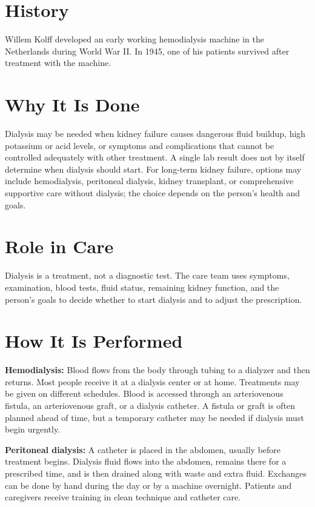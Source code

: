 \section*{History}
Willem Kolff developed an early working hemodialysis machine in the Netherlands during World War II. In 1945, one of his patients survived after treatment with the machine.

\section*{Why It Is Done}
Dialysis may be needed when kidney failure causes dangerous fluid buildup, high potassium or acid levels, or symptoms and complications that cannot be controlled adequately with other treatment. A single lab result does not by itself determine when dialysis should start. For long-term kidney failure, options may include hemodialysis, peritoneal dialysis, kidney transplant, or comprehensive supportive care without dialysis; the choice depends on the person's health and goals.

\section*{Role in Care}
Dialysis is a treatment, not a diagnostic test. The care team uses symptoms, examination, blood tests, fluid status, remaining kidney function, and the person's goals to decide whether to start dialysis and to adjust the prescription.

\section*{How It Is Performed}
\textbf{Hemodialysis:} Blood flows from the body through tubing to a dialyzer and then returns. Most people receive it at a dialysis center or at home. Treatments may be given on different schedules. Blood is accessed through an arteriovenous fistula, an arteriovenous graft, or a dialysis catheter. A fistula or graft is often planned ahead of time, but a temporary catheter may be needed if dialysis must begin urgently.

\textbf{Peritoneal dialysis:} A catheter is placed in the abdomen, usually before treatment begins. Dialysis fluid flows into the abdomen, remains there for a prescribed time, and is then drained along with waste and extra fluid. Exchanges can be done by hand during the day or by a machine overnight. Patients and caregivers receive training in clean technique and catheter care.

